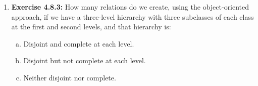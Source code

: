 \documentclass[12pt]{article}
\begin{document}
\begin{enumerate}[1.]
    \item \textbf{Exercise 4.8.3:} How many relations do we create, using the object-oriented
    approach, if we have a three-level hierarchy with three subclasses of each class
    at the first and second levels, and that hierarchy is:

    \begin{enumerate}[a)]
        \item Disjoint and complete at each level.
        \item Disjoint but not complete at each level.
        \item Neither disjoint nor complete.
    \end{enumerate}
\end{enumerate}
\end{document}
